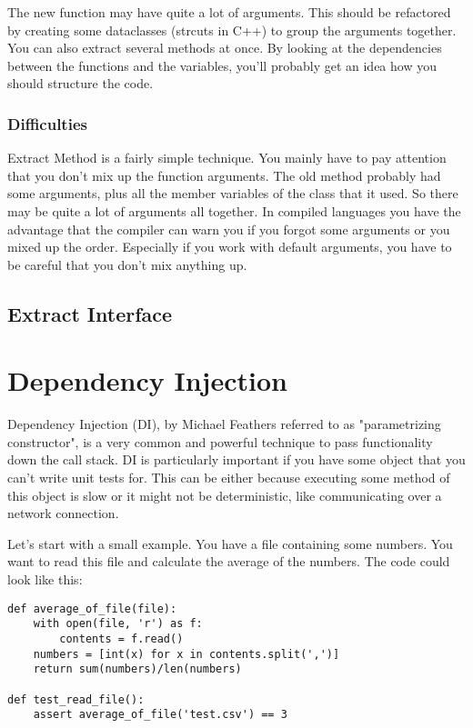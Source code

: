 The new function may have quite a lot of arguments. This should be refactored by creating some dataclasses (strcuts in C++) to group the arguments together. You can also extract several methods at once. By looking at the dependencies between the functions and the variables, you'll probably get an idea how you should structure the code.

\subsubsection*{Difficulties}

Extract Method is a fairly simple technique. You mainly have to pay attention that you don't mix up the function arguments. The old method probably had some arguments, plus all the member variables of the class that it used. So there may be quite a lot of arguments all together. In compiled languages you have the advantage that the compiler can warn you if you forgot some arguments or you mixed up the order. Especially if you work with default arguments, you have to be careful that you don't mix anything up.

\subsection{Extract Interface}


\section{Dependency Injection}\label{sec:dependency_injection}

Dependency Injection (DI), by Michael Feathers referred to as "parametrizing constructor", is a very common and powerful technique to pass functionality down the call stack. DI is particularly important if you have some object that you can't write unit tests for. This can be either because executing some method of this object is slow or it might not be deterministic, like communicating over a network connection.

Let's start with a small example. You have a file containing some numbers. You want to read this file and calculate the average of the numbers. The code could look like this:

\begin{programcode}{}\label{prog:average_of_file}
\begin{verbatim}
def average_of_file(file):
    with open(file, 'r') as f:
        contents = f.read()
    numbers = [int(x) for x in contents.split(',')]
    return sum(numbers)/len(numbers)

def test_read_file():
    assert average_of_file('test.csv') == 3
\end{verbatim} 
\end{programcode}

